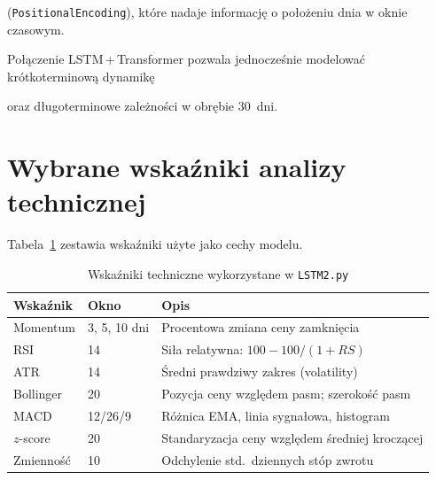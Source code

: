 \documentclass[12pt,a4paper]{report}
\begin{document}
(\texttt{PositionalEncoding}), które nadaje informację o położeniu dnia w oknie czasowym.

Połączenie LSTM\,+\,Transformer pozwala jednocześnie modelować krótkoterminową dynamikę

oraz długoterminowe zależności w obrębie 30~dni.



\section{Wybrane wskaźniki analizy technicznej}



Tabela~\ref{tab:wskazniki} zestawia wskaźniki użyte jako cechy modelu.



\begin{table}[H]

\centering

\caption{Wskaźniki techniczne wykorzystane w \texttt{LSTM2.py}}

\label{tab:wskazniki}

\begin{tabular}{@{}llp{7cm}@{}}

\toprule

\textbf{Wskaźnik} & \textbf{Okno} & \textbf{Opis} \\

\midrule

Momentum & 3, 5, 10 dni & Procentowa zmiana ceny zamknięcia \\

RSI & 14 & Siła relatywna: $100 - 100/(1 + RS)$ \\

ATR & 14 & Średni prawdziwy zakres (volatility) \\

Bollinger & 20 & Pozycja ceny względem pasm; szerokość pasm \\

MACD & 12/26/9 & Różnica EMA, linia sygnałowa, histogram \\

$z$-score & 20 & Standaryzacja ceny względem średniej kroczącej \\

Zmienność & 10 & Odchylenie std.\ dziennych stóp zwrotu \\

\bottomrule

\end{tabular}

\end{table}
\end{document}
